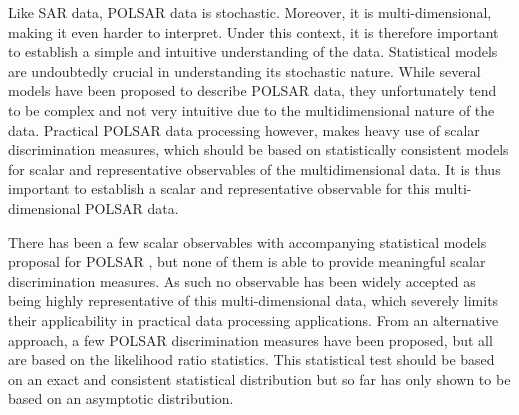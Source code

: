 \documentclass[journal]{IEEEtran}
\begin{document}
Like SAR data, POLSAR data is stochastic.
Moreover, it is multi-dimensional, making it even harder to interpret.
Under this context, it is therefore important to establish a simple and intuitive understanding of the data.
 Statistical models are undoubtedly crucial in understanding its stochastic nature.
While several %
models have been proposed to describe POLSAR data, they
  unfortunately tend to be complex and not very intuitive due to the multidimensional nature of the data.
Practical POLSAR data processing however, makes heavy use of scalar discrimination measures,
  which should be based on statistically consistent models for scalar and representative observables of the multidimensional data.
It is thus important to establish a scalar and representative observable for this multi-dimensional POLSAR data.
  

There has been a few scalar observables with accompanying statistical models proposal for POLSAR \cite{Conradsen_2003_TGRS_4, Alberga_2008_IJRS_4129, Joughin_1994_TGRS_562, Lee_1994_TGRS_1017, Touzi_1996_TGRS_519, Lopez-Martinez_2003_TGRS_2232, Erten_2012_Sensors_2766},
  but none of them is able to provide meaningful scalar discrimination measures.
As such no observable has been widely accepted as being highly representative of this multi-dimensional data,
  which severely limits their applicability in practical data processing applications.
From an alternative approach, a few POLSAR discrimination measures have been proposed,
  but all are based on the likelihood ratio statistics.
This statistical test should be based on an exact and consistent statistical distribution
  but so far has only shown to be based on an asymptotic distribution.
\end{document}
